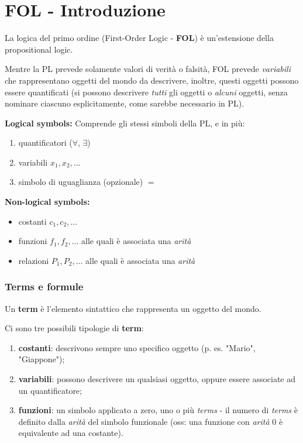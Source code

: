 \chapter{FOL - Introduzione}

La logica del primo ordine (First-Order Logic - \textbf{FOL}) è un'estensione della propositional logic.

Mentre la PL prevede solamente valori di verità o falsità, FOL prevede \textit{variabili} che rappresentano oggetti del mondo da descrivere, inoltre, questi oggetti possono essere quantificati (si possono descrivere \textit{tutti} gli oggetti o \textit{alcuni} oggetti, senza nominare ciascuno esplicitamente, come sarebbe necessario in PL).

\begin{fdefinition}
\textbf{Logical symbols:}
Comprende gli stessi simboli della PL, e in più:
\begin{enumerate}
\item quantificatori ($\forall$, $\exists$)
\item variabili $x_1, x_2, ...$
\item simbolo di uguaglianza (opzionale) $=$
\end{enumerate}

\noindent\textbf{Non-logical symbols:}
\begin{itemize}
\item costanti $c_1, c_2, ...$
\item funzioni $f_1, f_2, ...$ alle quali è associata una \textit{arità}
\item relazioni $P_1, P_2, ...$ alle quali è associata una \textit{arità}
\end{itemize}
\end{fdefinition}


\subsection{Terms e formule}

Un \textbf{term} è l'elemento sintattico che rappresenta un oggetto del mondo.

Ci sono tre possibili tipologie di \textbf{term}:
\begin{enumerate}
\item \textbf{costanti}: descrivono sempre uno specifico oggetto (p. es. "Mario", "Giappone");
\item \textbf{variabili}: possono descrivere un qualsiasi oggetto, oppure essere associate ad un quantificatore;
\item \textbf{funzioni}: un simbolo applicato a zero, uno o più \textit{terms} - il numero di \textit{terms} è definito dalla \textit{arità} del simbolo funzionale (oss: una funzione con \textit{arità} 0 è equivalente ad una costante).
\end{enumerate}

